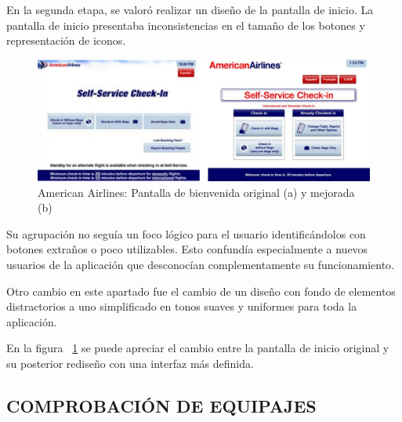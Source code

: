 En la segunda etapa, se valoró realizar un diseño de la pantalla de inicio. La
pantalla de inicio presentaba inconsistencias en el tamaño de los botones y
representación de iconos.

\begin{figure}[ht]
    \begin{center}
        \includegraphics[width=425px]{src/img/american-airlines-welcome-screen.pdf}
        \caption[American Airlines: Pantalla de
        bienvenida original (a) y mejorada (b)] {American Airlines: Pantalla de
        bienvenida original (a) y mejorada (b)}
        \label{fig:AmericanWelcome}
    \end{center}
\end{figure}

\newpage

Su agrupación no seguía un foco lógico para el usuario identificándolos con
botones extraños o poco utilizables. Esto confundía especialmente a nuevos
usuarios de la aplicación que desconocían complementamente su funcionamiento.

Otro cambio en este apartado fue el cambio de un diseño con fondo de
elementos distractorios a uno simplificado en tonos suaves y uniformes para
toda la aplicación.

En la figura ~\ref{fig:AmericanWelcome} se puede apreciar el cambio entre la
pantalla de inicio original y su posterior rediseño con una interfaz más
definida.

\subsection{\uppercase{Comprobación de equipajes}}

